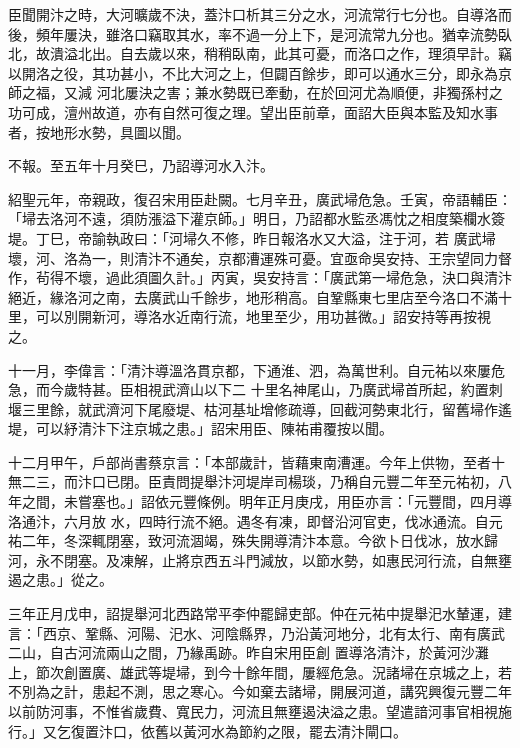 \begin{pinyinscope}
 臣聞開汴之時，大河曠歲不決，蓋汴口析其三分之水，河流常行七分也。自導洛而後，頻年屢決，雖洛口竊取其水，率不過一分上下，是河流常九分也。猶幸流勢臥北，故潰溢北出。自去歲以來，稍稍臥南，此其可憂，而洛口之作，理須早計。竊以開洛之役，其功甚小，不比大河之上，但闢百餘步，即可以通水三分，即永為京師之福，又減
 河北屢決之害；兼水勢既已牽動，在於回河尤為順便，非獨孫村之功可成，澶州故道，亦有自然可復之理。望出臣前章，面詔大臣與本監及知水事者，按地形水勢，具圖以聞。



 不報。至五年十月癸巳，乃詔導河水入汴。



 紹聖元年，帝親政，復召宋用臣赴闕。七月辛丑，廣武埽危急。壬寅，帝語輔臣：「埽去洛河不遠，須防漲溢下灌京師。」明日，乃詔都水監丞馮忱之相度築欄水簽堤。丁巳，帝諭執政曰：「河埽久不修，昨日報洛水又大溢，注于河，若
 廣武埽壞，河、洛為一，則清汴不通矣，京都漕運殊可憂。宜亟命吳安持、王宗望同力督作，茍得不壞，過此須圖久計。」丙寅，吳安持言：「廣武第一埽危急，決口與清汴絕近，緣洛河之南，去廣武山千餘步，地形稍高。自鞏縣東七里店至今洛口不滿十里，可以別開新河，導洛水近南行流，地里至少，用功甚微。」詔安持等再按視之。



 十一月，李偉言：「清汴導溫洛貫京都，下通淮、泗，為萬世利。自元祐以來屢危急，而今歲特甚。臣相視武濟山以下二
 十里名神尾山，乃廣武埽首所起，約置刺堰三里餘，就武濟河下尾廢堤、枯河基址增修疏導，回截河勢東北行，留舊埽作遙堤，可以紓清汴下注京城之患。」詔宋用臣、陳祐甫覆按以聞。



 十二月甲午，戶部尚書蔡京言：「本部歲計，皆藉東南漕運。今年上供物，至者十無二三，而汴口已閉。臣責問提舉汴河堤岸司楊琰，乃稱自元豐二年至元祐初，八年之間，未嘗塞也。」詔依元豐條例。明年正月庚戌，用臣亦言：「元豐間，四月導洛通汴，六月放
 水，四時行流不絕。遇冬有凍，即督沿河官吏，伐冰通流。自元祐二年，冬深輒閉塞，致河流涸竭，殊失開導清汴本意。今欲卜日伐冰，放水歸河，永不閉塞。及凍解，止將京西五斗門減放，以節水勢，如惠民河行流，自無壅遏之患。」從之。



 三年正月戊申，詔提舉河北西路常平李仲罷歸吏部。仲在元祐中提舉汜水輦運，建言：「西京、鞏縣、河陽、汜水、河陰縣界，乃沿黃河地分，北有太行、南有廣武二山，自古河流兩山之間，乃緣禹跡。昨自宋用臣創
 置導洛清汴，於黃河沙灘上，節次創置廣、雄武等堤埽，到今十餘年間，屢經危急。況諸埽在京城之上，若不別為之計，患起不測，思之寒心。今如棄去諸埽，開展河道，講究興復元豐二年以前防河事，不惟省歲費、寬民力，河流且無壅遏決溢之患。望遣諳河事官相視施行。」又乞復置汴口，依舊以黃河水為節約之限，罷去清汴閘口。




\end{pinyinscope}
